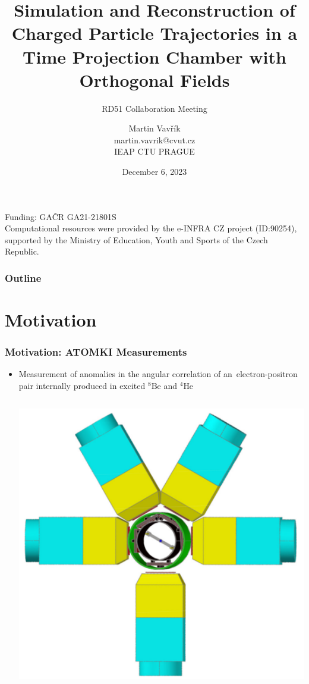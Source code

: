 \documentclass{beamer}
\title[OFTPC track simulation \& reconstruction]{Simulation and Reconstruction of Charged Particle Trajectories in a Time Projection Chamber with Orthogonal Fields}
\subtitle{RD51 Collaboration Meeting}
\author[M.~Vavřík]{\foreignlanguage{czech}{Martin Vavřík}\vspace{0.5cm}\\martin.vavrik@cvut.cz\\IEAP CTU PRAGUE\\}
\date{December 6, 2023}
\begin{document}
	
	\begin{frame}
		\titlepage
		\flushleft\scriptsize{Funding: GAČR GA21-21801S\\}
		\tiny{Computational resources were provided by the e-INFRA CZ project (ID:90254),\\ supported by the Ministry of Education, Youth and Sports of the Czech Republic.}
	\end{frame}
	
	\begin{frame}
		\frametitle{Outline}
		\tableofcontents
	\end{frame}
	
	\section{Motivation}
	\begin{frame}
		\frametitle{Motivation: ATOMKI Measurements}
		\begin{itemize}
			\item Measurement of anomalies in the angular correlation of an~electron-positron pair internally produced in excited $ {}^8\text{Be} $ and $ {}^4\text{He} $\newline
			\begin{columns}
				\column{0.33 \textwidth}
					\centering
					\begin{minipage}[t][4cm]{\textwidth}
						\centering
						\includegraphics[width=\textwidth]{../images/atomki_detector.png}

\end{minipage}
\end{columns}
\end{itemize}
\end{frame}
\end{document}
